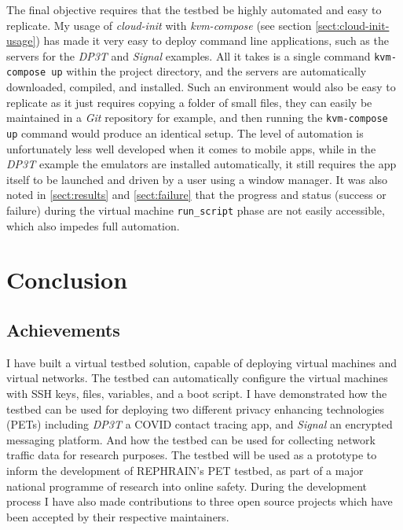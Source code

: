 \documentclass[
    author={Jacob Daniel Halsey},
    supervisor={Prof. Awais Rashid},
    degree={BSc},
    title={Building a Testbed for Evaluating Privacy Enhancing Technologies  (PETs)},
    subtitle={},
    type={software development},
    year={2021}
]{dissertation}
\begin{document}
The final objective requires that the testbed be highly automated and easy to replicate.
My usage of \emph{cloud-init} with \emph{kvm-compose} (see section \ref{sect:cloud-init-usage})
has made it very easy to deploy command line applications, such as the servers for the
\emph{DP3T} and \emph{Signal} examples.
All it takes is a single command \texttt{kvm-compose up} within the project directory,
and the servers are automatically downloaded, compiled, and installed. Such an environment
would also be easy to replicate as it just requires copying a folder of small files,
they can easily be maintained in a \emph{Git} repository for example,
and then running the \texttt{kvm-compose up} command would produce an identical setup.
The level of automation is
unfortunately less well developed when it comes to mobile apps, while in the \emph{DP3T} example
the emulators are installed automatically, it still requires the app itself to be launched and driven
by a user using a window manager. It was also noted in \ref{sect:results} and \ref{sect:failure}
that the progress and status (success or failure) during the virtual machine \texttt{run\_script}
phase are not easily accessible, which also impedes full automation. \\

\chapter{Conclusion}
\label{chap:conclusion}

\section{Achievements}

I have built a virtual testbed solution, capable of deploying
virtual machines and virtual networks. The testbed can automatically configure
the virtual machines with SSH keys, files, variables, and a boot script.
I have demonstrated how the testbed can be used for deploying two different privacy enhancing technologies
(PETs) including \emph{DP3T} a COVID contact tracing app, and \emph{Signal} an encrypted messaging platform.
And how the testbed can be used for collecting network traffic data for research purposes.
The testbed will be used as a prototype to inform the development of REPHRAIN's PET testbed, 
as part of a major national programme of research into online safety.
During the development process I have also made contributions to three open source projects which 
have been accepted by their respective maintainers.
\end{document}
